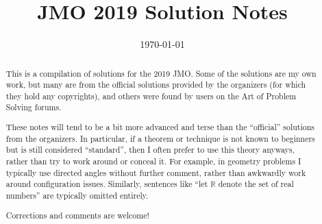 \documentclass[11pt]{scrartcl}
\title{JMO 2019 Solution Notes}
\date{\today}
\begin{document}
\maketitle

\begin{abstract}
This is a compilation of solutions
for the 2019 JMO.
Some of the solutions are my own work,
but many are from the official solutions provided by the organizers
(for which they hold any copyrights),
and others were found by users on the Art of Problem Solving forums.

These notes will tend to be a bit more advanced and terse than the ``official''
solutions from the organizers.
In particular, if a theorem or technique is not known to beginners
but is still considered ``standard'', then I often prefer to
use this theory anyways, rather than try to work around or conceal it.
For example, in geometry problems I typically use directed angles
without further comment, rather than awkwardly work around configuration issues.
Similarly, sentences like ``let $\mathbb{R}$ denote the set of real numbers''
are typically omitted entirely.

Corrections and comments are welcome!
\end{abstract}

\tableofcontents
\newpage

\addtocounter{section}{-1}
\end{document}
